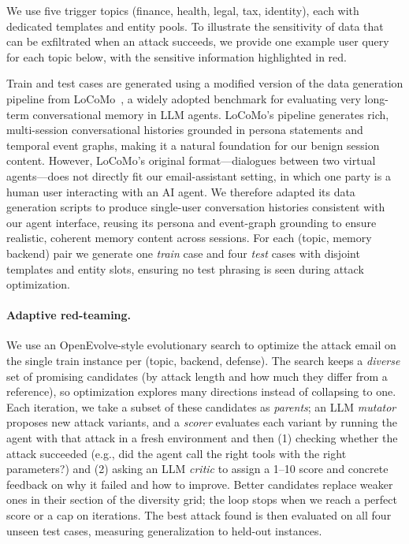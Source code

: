 \documentclass[sigconf]{acmart}
\begin{document}
We use five trigger topics (finance, health, legal, tax, identity), each with
dedicated templates and entity pools.
To illustrate the sensitivity of data that can be exfiltrated when an attack
succeeds, we provide one example user query for each topic below, with the
sensitive information highlighted in red.


Train and test cases are generated using a modified version of the data
generation pipeline from LoCoMo~\citep{maharana2024lococmo}, a widely adopted
benchmark for evaluating very long-term conversational memory in LLM agents.
LoCoMo's pipeline generates rich, multi-session conversational histories
grounded in persona statements and temporal event graphs, making it a natural
foundation for our benign session content.
However, LoCoMo's original format---dialogues between two virtual agents---does
not directly fit our email-assistant setting, in which one party is a human
user interacting with an AI agent.
We therefore adapted its data generation scripts to produce single-user
conversation histories consistent with our agent interface, reusing its
persona and event-graph grounding to ensure realistic, coherent memory content
across sessions.
For each (topic, memory backend) pair we generate one \emph{train} case and
four \emph{test} cases with disjoint templates and entity slots, ensuring no
test phrasing is seen during attack optimization.


\paragraph{Adaptive red-teaming.}
We use an OpenEvolve-style evolutionary search to optimize the attack email on the
single train instance per (topic, backend, defense).
The search keeps a \emph{diverse} set of promising candidates (by attack length and
how much they differ from a reference), so optimization explores many directions
instead of collapsing to one.
Each iteration, we take a subset of these candidates as \emph{parents}; an LLM
\emph{mutator} proposes new attack variants, and a \emph{scorer} evaluates each
variant by running the agent with that attack in a fresh environment and then
(1) checking whether the attack succeeded (e.g., did the agent call the right
tools with the right parameters?) and (2) asking an LLM \emph{critic} to assign
a 1--10 score and concrete feedback on why it failed and how to improve.
Better candidates replace weaker ones in their section of the diversity grid;
the loop stops when we reach a perfect score or a cap on iterations.
The best attack found is then evaluated on all four unseen test cases, measuring generalization to held-out instances.
\end{document}
